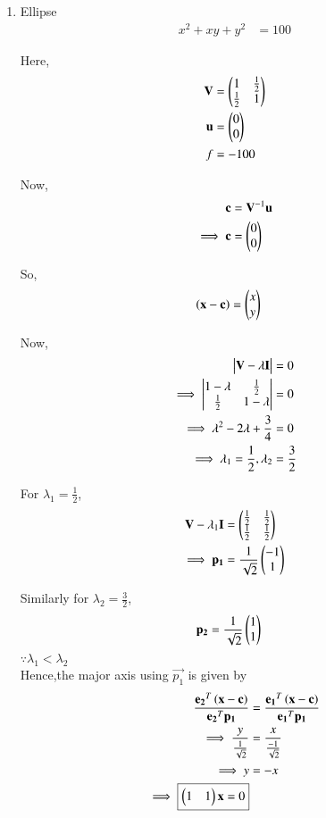 \documentclass[journal,12pt,twocolumn]{IEEEtran}
\begin{document}
\begin{enumerate}
    \item Ellipse
    \begin{align}
        x^2+xy+y^2 &= 100
    \end{align}
    
    Here,
    \begin{align}
    \mathbf{V} &= \begin{pmatrix}1 & \frac{1}{2} \\ \frac{1}{2} & 1\end{pmatrix} \\
    \mathbf{u} &= \begin{pmatrix}0 \\ 0\end{pmatrix} \\
    f &= -100
    \end{align}

    Now,
    \begin{align}
    \mathbf{c} &= \mathbf{V}^{-1}\mathbf{u}\\
    \implies \mathbf{c} &= \begin{pmatrix}0 \\ 0\end{pmatrix}
    \end{align}

    So,
    \begin{align}
    \left(\mathbf{x}-\mathbf{c}\right) &= \begin{pmatrix}x \\ y\end{pmatrix}
    \end{align}
    
    Now,
    \begin{align}
        \begin{vmatrix}\mathbf{V}-\lambda\mathbf{I}\end{vmatrix} &= 0 \\
        \implies \begin{vmatrix}1-\lambda & \frac{1}{2} \\ \frac{1}{2} & 1-\lambda\end{vmatrix} &= 0 \\
        \implies \lambda^2-2\lambda+\frac{3}{4} &= 0 \\
        \implies \lambda_1 =\frac{1}{2},\lambda_2 &= \frac{3}{2}
    \end{align}
    
    For $\lambda_1=\frac{1}{2}$,
    \begin{align}
        \mathbf{V}-\lambda_1\mathbf{I} &= \begin{pmatrix}\frac{1}{2} & \frac{1}{2} \\ \frac{1}{2} & \frac{1}{2}\end{pmatrix} \\
        \implies \mathbf{p_1} &= \frac{1}{\sqrt{2}}\begin{pmatrix}-1 \\ 1\end{pmatrix}
    \end{align}
    
    Similarly for $\lambda_2=\frac{3}{2}$,
    \begin{align}
        \mathbf{p_2} &= \frac{1}{\sqrt{2}}\begin{pmatrix}1 \\ 1\end{pmatrix}
    \end{align}
    $\because \lambda_1<\lambda_2$ \\
    Hence,the major axis using $\vec{p_1}$ is given by
    \begin{align}
        \frac{\mathbf{e_2}^T\left(\mathbf{x}-\mathbf{c}\right)}{{\mathbf{e_2}^T\mathbf{p_1}}} &= \frac{\mathbf{e_1}^T\left(\mathbf{x}-\mathbf{c}\right)}{{\mathbf{e_1}^T\mathbf{p_1}}}\\
        \implies \frac{y}{\frac{1}{\sqrt{2}}} &= \frac{x}{\frac{-1}{\sqrt{2}}} \\
        \implies y &= -x \\
        \implies \boxed{\begin{pmatrix}1 & 1\end{pmatrix}\mathbf{x} = 0}
    \end{align}
    

\end{enumerate}
\end{document}
